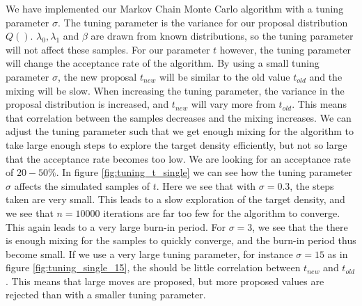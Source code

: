 We have implemented our Markov Chain Monte Carlo algorithm with a tuning parameter $\sigma$. The tuning parameter is the variance for our proposal distribution $Q()$. $\lambda_0, \lambda_1$ and $\beta$ are drawn from known distributions, so the tuning parameter will not affect these samples. For our parameter $t$ however, the tuning parameter will change the acceptance rate of the algorithm. By using a small tuning parameter $\sigma$, the new proposal $t_{new}$ will be similar to the old value $t_{old}$ and the mixing will be slow. When increasing the tuning parameter, the variance in the proposal distribution is increased, and $t_{new}$ will vary more from $t_{old}$. This means that correlation between the samples decreases and the mixing increases. We can adjust the tuning parameter such that we get enough mixing for the algorithm to take large enough steps to explore the target density efficiently, but not so large that the acceptance rate becomes too low. We are looking for an acceptance rate of $20 - 50\%$. In figure \ref{fig:tuning_t_single} we can see how the tuning parameter $\sigma$ affects the simulated samples of $t$.  Here we see that with $\sigma = 0.3$, the steps taken are very small. This leads to a slow exploration of the target density, and we see that $n = 10000$ iterations are far too few for the algorithm to converge. This again leads to a very large burn-in period. For $\sigma = 3$, we see that the there is enough mixing for the samples to quickly converge, and the burn-in period thus become small. If we use a very large tuning parameter, for instance $\sigma = 15$ as in figure \ref{fig:tuning_single_15}, the should be little correlation between $t_{new}$ and $t_{old}$. This means that large moves are proposed, but more proposed values are rejected than with a smaller tuning parameter. 



